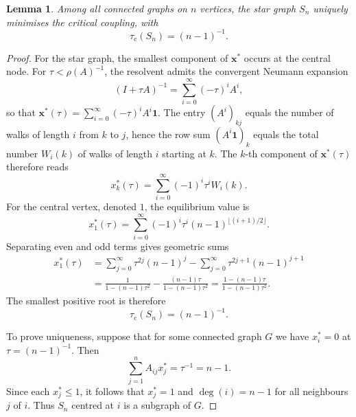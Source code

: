 \documentclass[a4paper,12pt]{article}
\newtheorem{lemma}{Lemma}
\begin{document}
\begin{lemma}\label{lem:dmax}
    Among all connected graphs on $n$ vertices, the star graph $S_n$ uniquely minimises the critical coupling, with
    \begin{equation}
        \tau_{\mathrm c}(S_{n}) = (n-1)^{-1}.
    \end{equation}
\end{lemma}
\begin{proof}
    For the star graph, the smallest component of $\mathbf{x^*}$ occurs at the central node. For $\tau<\rho(A)^{-1}$, the resolvent admits the convergent Neumann expansion
    \begin{equation*}
        (I+\tau A)^{-1} = \sum_{i=0}^\infty (-\tau)^i A^i,
    \end{equation*}
    so that $\mathbf{x^*}(\tau) = \sum_{i=0}^\infty (-\tau)^i A^i\mathbf{1}$. The entry $(A^i)_{kj}$ equals the number of walks of length $i$ from $k$ to $j$, hence the row sum $(A^i\mathbf{1})_k$ equals the total number $W_i(k)$ of walks of length $i$ starting at $k$. The $k$-th component of $\mathbf{x^*}(\tau)$ therefore reads
    \begin{equation*}
        x_k^*(\tau)=\sum_{i=0}^{\infty}(-1)^i \tau^i W_i(k).
    \end{equation*}
    For the central vertex, denoted $1$, the equilibrium value is
    \begin{equation*}
        x_1^*(\tau) = \sum_{i=0}^\infty (-1)^i \tau^i (n-1)^{\lfloor (i+1)/2 \rfloor}.
    \end{equation*}
    Separating even and odd terms gives geometric sums
    \begin{align*}
        x_1^*(\tau)
        &= \sum_{j=0}^\infty \tau^{2j} (n-1)^j
        - \sum_{j=0}^\infty \tau^{2j+1} (n-1)^{j+1} \\
        &= \frac{1}{1-(n-1)\tau^2}
        - \frac{(n-1)\tau}{1-(n-1)\tau^2}
        = \frac{1-(n-1)\tau}{1-(n-1)\tau^2}.
    \end{align*}
    The smallest positive root is therefore
    \begin{equation*}
        \tau_{\mathrm c}(S_{n}) = (n-1)^{-1}.
    \end{equation*}

    To prove uniqueness, suppose that for some connected graph $G$ we have $x_i^*=0$ at $\tau=(n-1)^{-1}$. Then
    \begin{equation*}
        \sum_{j=1}^{n} A_{ij} x_j^* = \tau^{-1} = n-1.
    \end{equation*}
    Since each $x_j^* \le 1$, it follows that $x_j^* = 1$ and $\deg(i)=n-1$ for all neighbours $j$ of $i$. Thus $S_{n}$ centred at $i$ is a subgraph of $G$.
    

\end{proof}
\end{document}
